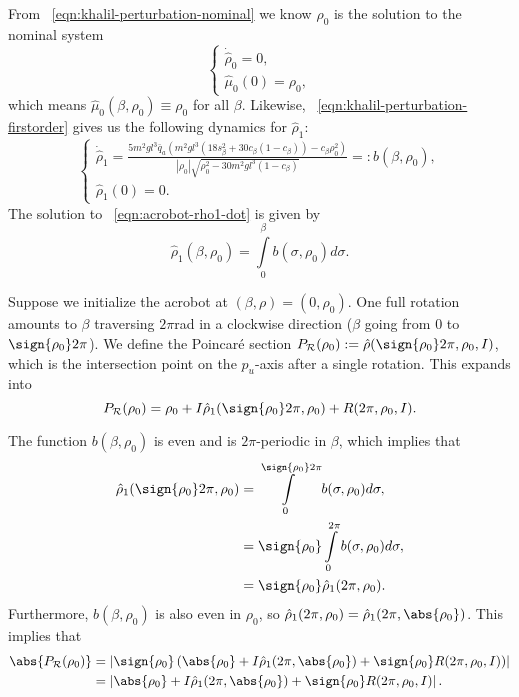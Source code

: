 From ~\eqref{eqn:khalil-perturbation-nominal} we know
\(\hat{\rho}_0\) is the solution to the nominal system
\[
    \begin{cases} 
        \dot{\hat{\rho}}_0 = 0
        , \\
        \hat{\mu}_0(0) = \rho_0
        ,
    \end{cases}
\]
which means \(\hat{\mu}_0(\beta,\rho_0) \equiv \rho_0\) for all \(\beta\).
Likewise, ~\eqref{eqn:khalil-perturbation-firstorder} 
gives us the following dynamics for \(\hat{\rho}_1\):
\begin{equation}\label{eqn:acrobot-rho1-dot}
  \begin{cases}
    \dot{\hat{\rho}}_1 =
    \frac{5m^2 g l^3 \bar{q}_a \left(
        m^2gl^3\left(18s_\beta^2 + 30c_\beta(1 - c_\beta)\right)
        - c_\beta\rho_0^2
    \right)}{
    |\rho_0|\sqrt{\rho_0^2 - 30m^2gl^3(1 - c_\beta)}
    }
    =: b(\beta,\rho_0)
     , \\
     \hat{\rho}_1(0) = 0
     .
 \end{cases}
\end{equation}
The solution to ~\eqref{eqn:acrobot-rho1-dot} is given by
\[
    \hat{\rho}_1(\beta,\rho_0) = \int \limits_0^\beta b(\sigma,\rho_0)d\sigma
    .
\]

Suppose we initialize the acrobot at \((\beta,\rho) = (0,\rho_0)\).
One full rotation amounts to \(\beta\) traversing \(2\pi\)rad in a clockwise
direction (\ie \(\beta\) going from \(0\) to \(\sign{\rho_0}2\pi\)).
We define the Poincar\'{e} section
\(P_\mathcal{R}(\rho_0) := \hat{\rho}(\sign{\rho_0}2\pi,\rho_0,I)\),
which is the intersection point on the \(p_u\)-axis after a single rotation.
This expands into
\[
    P_\mathcal{R}(\rho_0) = \rho_0 + I \hat{\rho}_1(\sign{\rho_0}2\pi, \rho_0)
      + R(2\pi,\rho_0,I)
    .
\]

The function \(b(\beta,\rho_0)\) is even and is 
\(2\pi\)-periodic in \(\beta\), which implies that
\begin{align*}
    \hat{\rho}_1(\sign{\rho_0}2\pi, \rho_0) &=
    \int \limits_0^{\sign{\rho_0}2\pi} b(\sigma,\rho_0)d\sigma
    , \\
     &=\sign{\rho_0}\int\limits_0^{2\pi}b(\sigma,\rho_0)d\sigma
     , \\
     &= \sign{\rho_0} \hat{\rho}_1(2\pi,\rho_0)
     .
\end{align*}
Furthermore, \(b(\beta,\rho_0)\) is also even in \(\rho_0\), 
so \(\hat{\rho}_1(2\pi,\rho_0) = \hat{\rho}_1(2\pi,\abs{\rho_0})\).
This implies that
\begin{align*}
    \abs{P_\mathcal{R}(\rho_0)} &= \left|\sign{\rho_0}\left(
        \abs{\rho_0} + I \hat{\rho}_1(2\pi,\abs{\rho_0})
        + \sign{\rho_0}R(2\pi,\rho_0,I)\right)\right|
    \\
    &= \left|\abs{\rho_0} + I \hat{\rho}_1(2\pi,\abs{\rho_0})
        + \sign{\rho_0}R(2\pi,\rho_0,I)\right|
    .
\end{align*}

